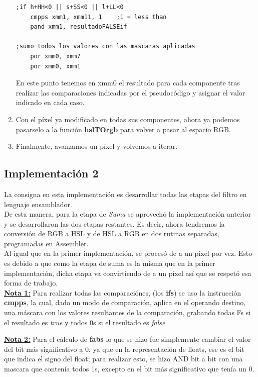 \begin{enumerate}
\begin{lstlisting}
;if h+HH<0 || s+SS<0 || l+LL<0
	cmpps xmm1,	xmm11, 1	;1 = less than
	pand xmm1, resultadoFALSEif

;sumo todos los valores con las mascaras aplicadas
	por xmm0, xmm7
	por xmm0, xmm1
\end{lstlisting}
En este punto tenemos en xmm0 el resultado para cada componente tras realizar las comparaciones indicadas por el pseudocódigo y asignar el valor indicado en cada caso. 
\item Con el píxel ya modificado en todas sus componentes, ahora ya podemos pasarselo a la función \textbf{hslTOrgb} para volver a pasar al espacio RGB.
\item Finalmente, avanzamos un píxel y volvemos a iterar.

\end{enumerate}

\subsection{Implementación 2}
La consigna en esta implementación es desarrollar todas las etapas del filtro en lenguaje ensamblador.\\
De esta manera, para la etapa de \textit{Suma} se aprovechó la implementación anterior y se desarrollaron las dos etapas restantes. Es decir, ahora tendremos la conversión de RGB a HSL y de HSL a RGB en dos rutinas separadas, programadas en Assembler.\\

Al igual que en la primer implementación, se procesó de a un píxel por vez. Esto es debido a que como la etapa de suma es la misma que en la primer implementación, dicha etapa va convirtiendo de a un píxel así que se respetó esa forma de trabajo.\\

\underline{\textbf{Nota 1:}} Para realizar todas las comparaciónes, (los \textbf{ifs}) se uso la instrucción \textbf{cmpps}, la cual, dado un modo de comparación, aplica en el operando destino, una máscara con los valores resultantes de la comparación, grabando todas Fs si el resultado es \textit{true} y todos 0s si el resultado es \textit{false}

\underline{\textbf{Nota 2:}} Para el cálculo de \textbf{fabs} lo que se hizo fue simplemente cambiar el valor del bit más significativo a 0, ya que en la representación de floats, ese es el bit que indica el signo del float; para realizar esto, se hizo AND bit a bit con una mascara que contenía todos 1s, excepto en el bit más significativo que tenía un 0.

